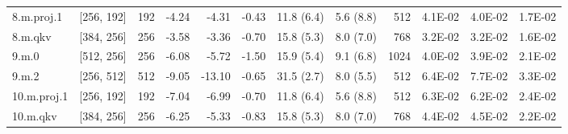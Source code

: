 \begin{table}
\begin{tabular}{llrrrrllrrrr}
8.m.proj.1 & [256, 192] & 192 & {\cellcolor[HTML]{F5FBB2}} \color[HTML]{000000} -4.24 & {\cellcolor[HTML]{F5FBB2}} \color[HTML]{000000} -4.31 & {\cellcolor[HTML]{EBF7A3}} \color[HTML]{000000} -0.43 & 11.8 (6.4) & 5.6 (8.8) & 512 & {\cellcolor[HTML]{ECF7A6}} \color[HTML]{000000} 4.1E-02 & {\cellcolor[HTML]{EBF7A3}} \color[HTML]{000000} 4.0E-02 & {\cellcolor[HTML]{C9E881}} \color[HTML]{000000} 1.7E-02 \\
8.m.qkv & [384, 256] & 256 & {\cellcolor[HTML]{F4FAB0}} \color[HTML]{000000} -3.58 & {\cellcolor[HTML]{F2FAAE}} \color[HTML]{000000} -3.36 & {\cellcolor[HTML]{EBF7A3}} \color[HTML]{000000} -0.70 & 15.8 (5.3) & 8.0 (7.0) & 768 & {\cellcolor[HTML]{E0F295}} \color[HTML]{000000} 3.2E-02 & {\cellcolor[HTML]{E0F295}} \color[HTML]{000000} 3.2E-02 & {\cellcolor[HTML]{C7E77F}} \color[HTML]{000000} 1.6E-02 \\
9.m.0 & [512, 256] & 256 & {\cellcolor[HTML]{FAFDB8}} \color[HTML]{000000} -6.08 & {\cellcolor[HTML]{FAFDB8}} \color[HTML]{000000} -5.72 & {\cellcolor[HTML]{EEF8A8}} \color[HTML]{000000} -1.50 & 15.9 (5.4) & 9.1 (6.8) & 1024 & {\cellcolor[HTML]{EBF7A3}} \color[HTML]{000000} 4.0E-02 & {\cellcolor[HTML]{E9F6A1}} \color[HTML]{000000} 3.9E-02 & {\cellcolor[HTML]{CFEB85}} \color[HTML]{000000} 2.1E-02 \\
9.m.2 & [256, 512] & 512 & {\cellcolor[HTML]{FFFCBA}} \color[HTML]{000000} -9.05 & {\cellcolor[HTML]{FFF3AC}} \color[HTML]{000000} -13.10 & {\cellcolor[HTML]{EBF7A3}} \color[HTML]{000000} -0.65 & 31.5 (2.7) & 8.0 (5.5) & 512 & {\cellcolor[HTML]{FFF6B0}} \color[HTML]{000000} 6.4E-02 & {\cellcolor[HTML]{FEE999}} \color[HTML]{000000} 7.7E-02 & {\cellcolor[HTML]{E2F397}} \color[HTML]{000000} 3.3E-02 \\
10.m.proj.1 & [256, 192] & 192 & {\cellcolor[HTML]{FDFEBC}} \color[HTML]{000000} -7.04 & {\cellcolor[HTML]{FDFEBC}} \color[HTML]{000000} -6.99 & {\cellcolor[HTML]{EBF7A3}} \color[HTML]{000000} -0.70 & 11.8 (6.4) & 5.6 (8.8) & 512 & {\cellcolor[HTML]{FFF7B2}} \color[HTML]{000000} 6.3E-02 & {\cellcolor[HTML]{FFF8B4}} \color[HTML]{000000} 6.2E-02 & {\cellcolor[HTML]{D5ED88}} \color[HTML]{000000} 2.4E-02 \\
10.m.qkv & [384, 256] & 256 & {\cellcolor[HTML]{FBFDBA}} \color[HTML]{000000} -6.25 & {\cellcolor[HTML]{F8FCB6}} \color[HTML]{000000} -5.33 & {\cellcolor[HTML]{ECF7A6}} \color[HTML]{000000} -0.83 & 15.8 (5.3) & 8.0 (7.0) & 768 & {\cellcolor[HTML]{F1F9AC}} \color[HTML]{000000} 4.4E-02 & {\cellcolor[HTML]{F1F9AC}} \color[HTML]{000000} 4.5E-02 & {\cellcolor[HTML]{D1EC86}} \color[HTML]{000000} 2.2E-02 \\

\end{tabular}
\end{table}
